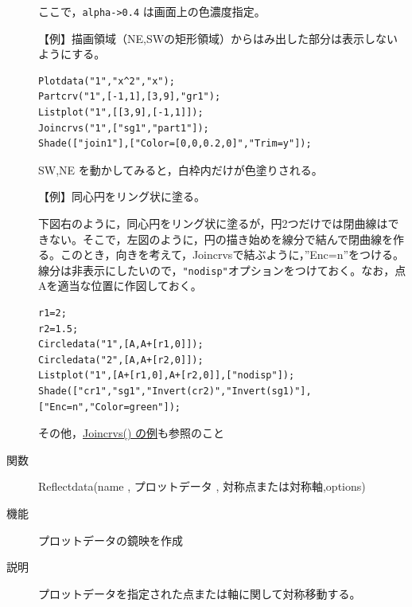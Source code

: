 \documentclass[papersize,a4paper,12pt,uplatex]{jsarticle}
\begin{document}
\begin{description}
ここで，\verb|alpha->0.4| は画面上の色濃度指定。

\vspace{\baselineskip}
\begin{center}\scalebox{0.9}{} \end{center}

\vspace{\baselineskip}
【例】描画領域（NE,SWの矩形領域）からはみ出した部分は表示しないようにする。

\begin{verbatim}
Plotdata("1","x^2","x");
Partcrv("1",[-1,1],[3,9],"gr1");
Listplot("1",[[3,9],[-1,1]]);
Joincrvs("1",["sg1","part1"]);
Shade(["join1"],["Color=[0,0,0.2,0]","Trim=y"]);
\end{verbatim}

SW,NE を動かしてみると，白枠内だけが色塗りされる。

\vspace{\baselineskip}
【例】同心円をリング状に塗る。

下図右のように，同心円をリング状に塗るが，円2つだけでは閉曲線はできない。そこで，左図のように，円の描き始めを線分で結んで閉曲線を作る。このとき，向きを考えて，Joincrvsで結ぶように，''Enc=n''をつける。線分は非表示にしたいので，\verb|"nodisp"|オプションをつけておく。なお，点Aを適当な位置に作図しておく。

\begin{verbatim}
r1=2;
r2=1.5;
Circledata("1",[A,A+[r1,0]]);
Circledata("2",[A,A+[r2,0]]);
Listplot("1",[A+[r1,0],A+[r2,0]],["nodisp"]);
Shade(["cr1","sg1","Invert(cr2)","Invert(sg1)"],["Enc=n","Color=green"]);
\end{verbatim}
\begin{center} \end{center}

その他，\hyperlink{joincrvs}{Joincrvs() の例}も参照のこと


\vspace{\baselineskip}
\hypertarget{reflectdata}{}
\item[関数]Reflectdata(name , プロットデータ , 対称点または対称軸,options)
\item[機能]プロットデータの鏡映を作成
\item[説明]プロットデータを指定された点または軸に関して対称移動する。


\end{description}
\end{document}
